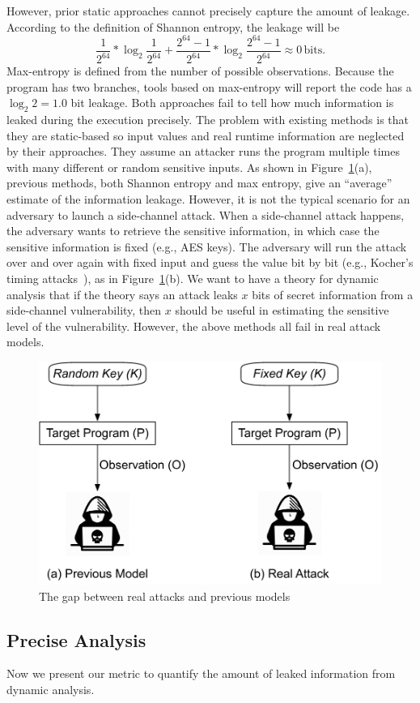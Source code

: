 However, prior static approaches cannot precisely capture the amount of leakage. According to the definition of Shannon entropy, the leakage will be
$$\frac{1}{2^{64}}*\log_{2}\frac{1}{2^{64}} + \frac{2^{64}-1}{2^{64}}
    *\log_{2}\frac{2^{64}-1}{2^{64}} \approx 0\, \mathrm{bits}.$$ Max-entropy is defined from the
number of possible observations. Because the program has two
branches, tools based on max-entropy will report the code has a $\log_2{2} = 1.0$
bit leakage.
Both approaches fail to tell how much information is leaked during the execution
precisely. The problem with existing methods is that they are static-based so
input values and real runtime information are neglected by their approaches.
They assume an attacker runs
the program multiple times with many different or random sensitive inputs. As
shown in Figure~\ref{fig:gap}(a), previous methods, both Shannon entropy and max
entropy, give an ``average'' estimate of the information leakage. However, it is
not the typical scenario for an adversary to launch a side-channel attack. When
a side-channel attack happens, the adversary wants to retrieve the sensitive
information, in which case the sensitive information is fixed (e.g., AES keys).
The adversary will run the attack over and over again with fixed input and
guess the value bit by
bit (e.g., Kocher's timing attacks~\cite{kocher1996timing}), as in Figure~\ref{fig:gap}(b). We want to have a
theory for dynamic analysis that if the theory says an attack leaks $x$ bits of
secret information from a side-channel vulnerability, then $x$ should be useful
in estimating the sensitive level of the vulnerability. However, the above
methods all fail in real attack models.
\begin{figure}
    \centering
    \includegraphics[width=.65\columnwidth]{./figures/chapter4/RA.pdf}
    \caption{The gap between real attacks and previous models}\label{fig:gap}
\end{figure}

\subsection{Precise Analysis}
Now we present our metric to quantify the amount of leaked information from
dynamic analysis.

